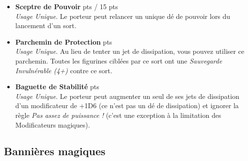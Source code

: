 \begin{multicols}{2}
\begin{itemize}[label={-}]
\item \textbf{Sceptre de Pouvoir}  {pts} / 15 {pts} \\
\emph{Usage Unique}. Le porteur peut relancer un unique dé de pouvoir lors du lancement d'un sort.

\item \textbf{Parchemin de Protection}  {pts} \\
\emph{Usage Unique}. Au lieu de tenter un jet de dissipation, vous pouvez utiliser ce parchemin. Toutes les figurines ciblées par ce sort ont une \emph{Sauvegarde Invulnérable (4+)} contre ce sort.

\item \textbf{Baguette de Stabilité}  {pts} \\
\emph{Usage Unique}. Le porteur peut augmenter un seul de ses jets de dissipation d'un modificateur de +1D6 (ce n'est pas un dé de dissipation) et ignorer la règle \emph{Pas assez de puissance !} (c'est une exception à la limitation des Modificateurs magiques).

\end{itemize}
\end{multicols}

\newpage

\subsection{Bannières magiques}

